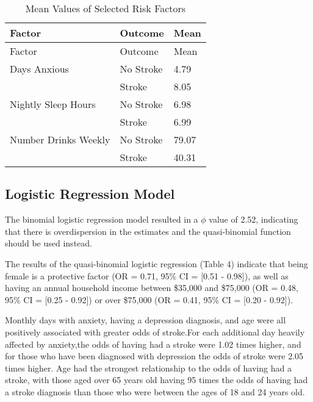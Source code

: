 \documentclass[11pt,]{article}
\begin{document}
\begin{longtable}[]{@{}lll@{}}
\caption{Mean Values of Selected Risk Factors}\tabularnewline
\toprule
Factor & Outcome & Mean\tabularnewline
\midrule
\endfirsthead
\toprule
Factor & Outcome & Mean\tabularnewline
\midrule
\endhead
Days Anxious & No Stroke & 4.79\tabularnewline
& Stroke & 8.05\tabularnewline
Nightly Sleep Hours & No Stroke & 6.98\tabularnewline
& Stroke & 6.99\tabularnewline
Number Drinks Weekly & No Stroke & 79.07\tabularnewline
& Stroke & 40.31\tabularnewline
\bottomrule
\end{longtable}

\hypertarget{logistic-regression-model-1}{%
\subsection{Logistic Regression
Model}\label{logistic-regression-model-1}}

The binomial logistic regression model resulted in a \(\phi\) value of
2.52, indicating that there is overdispersion in the estimates and the
quasi-binomial function should be used instead.

The results of the quasi-binomial logistic regression (Table 4) indicate
that being female is a protective factor (OR = 0.71, 95\% CI = {[}0.51 -
0.98{]}), as well as having an annual household income between \$35,000
and \$75,000 (OR = 0.48, 95\% CI = {[}0.25 - 0.92{]}) or over \$75,000
(OR = 0.41, 95\% CI = {[}0.20 - 0.92{]}).

Monthly days with anxiety, having a depression diagnosis, and age were
all positively associated with greater odds of stroke.For each
additional day heavily affected by anxiety,the odds of having had a
stroke were 1.02 times higher, and for those who have been diagnosed
with depression the odds of stroke were 2.05 times higher. Age had the
strongest relationship to the odds of having had a stroke, with those
aged over 65 years old having 95 times the odds of having had a stroke
diagnosis than those who were between the ages of 18 and 24 years old.
\end{document}
